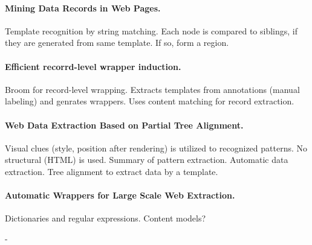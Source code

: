 \paragraph{Mining Data Records in Web Pages.} Template recognition by string matching. Each node is compared to siblings, if they are generated from same template. If so, form a region.
\paragraph{Efficient recorrd-level wrapper induction.} Broom for record-level wrapping. Extracts templates from annotations (manual labeling) and genrates wrappers. Uses content matching for record extraction.
\paragraph{Web Data Extraction Based on Partial Tree Alignment.} Visual clues (style, position after rendering) is utilized to recognized patterns. No structural (HTML) is used. Summary of pattern extraction. Automatic data extraction. Tree alignment to extract data by a template.
\paragraph{Automatic Wrappers for Large Scale Web Extraction.} Dictionaries and regular expressions. Content models?

- 


